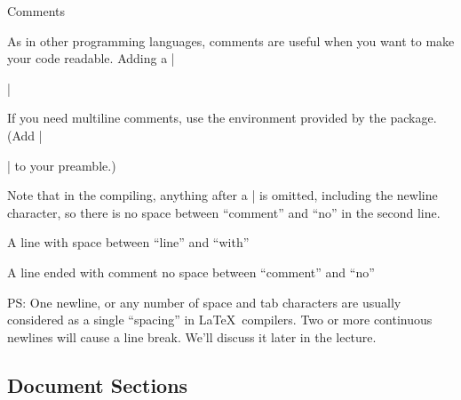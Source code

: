 \begin{frame}[fragile]{Comments}

As in other programming languages, comments are useful when you want to make your code readable. Adding a \LC|%

\begin{example}
\LC|%
\end{example} 

If you need multiline comments, use the  environment provided by the  package. (Add \LC|\usepackage{comment}| to your preamble.)

\begin{example}
\begin{LCL}

\end{LCL}
\end{example} 

\end{frame}

\begin{frame}[fragile]

Note that in the compiling, anything after a \LC|%
is omitted, including the newline character, so there is no space between ``comment'' and ``no'' in the second line.

\begin{latexexample}
A line
with space between ``line'' and ``with''

A line ended with comment%
no space between ``comment'' and ``no''
\end{latexexample}

PS: One newline, or any number of space and tab characters are usually considered as a single ``spacing'' in \LaTeX\ compilers. Two or more continuous newlines will cause a line break. We'll discuss it later in the lecture.


\end{frame}

\subsection{Document Sections}


